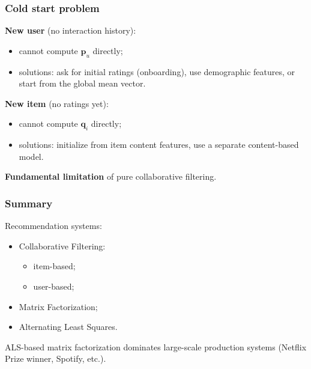 \documentclass[]{beamer}
\begin{document}
\begin{frame}[fragile]
\frametitle{Cold start problem}
\textbf{New user} (no interaction history):
\begin{itemize}
  \item cannot compute $\mathbf{p}_u$ directly;
  \item solutions: ask for initial ratings (onboarding), use demographic features, or start from the global mean vector.
\end{itemize}

\textbf{New item} (no ratings yet):
\begin{itemize}
  \item cannot compute $\mathbf{q}_i$ directly;
  \item solutions: initialize from item content features, use a separate content-based model.
\end{itemize}

\textbf{Fundamental limitation} of pure collaborative filtering.

\end{frame}

\begin{frame}[fragile]
\frametitle{Summary}
Recommendation systems:
\begin{itemize}
  \item Collaborative Filtering:
\begin{itemize}
  \item item-based;
  \item user-based;
\end{itemize}

  \item Matrix Factorization;
  \item Alternating Least Squares.
\end{itemize}

\vspace{3mm}
ALS-based matrix factorization dominates large-scale production systems (Netflix Prize winner, Spotify, etc.).
\end{frame}
\end{document}
